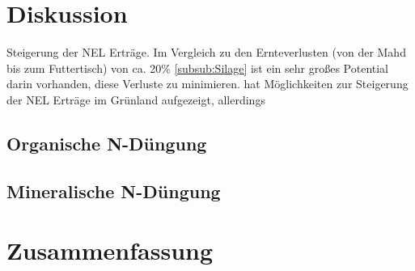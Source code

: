 \documentclass[12pt,titlepage]{scrartcl}
\begin{document}
\section{Diskussion}
\label{sec:Disukussion}
Steigerung der \ac{NEL} Erträge.
Im Vergleich zu den Ernteverlusten (von der Mahd bis zum Futtertisch) von ca. 20\% \ref{subsub:Silage} ist ein sehr großes Potential darin vorhanden, diese Verluste zu minimieren.
\textcite[33-36]{weggler2050leguminosen} hat Möglichkeiten zur Steigerung der \ac{NEL} Erträge im Grünland aufgezeigt, allerdings

\subsection{Organische N-Düngung}
\label{subsec:Dis:orgN}

\subsection{Mineralische N-Düngung}
\label{subsec:Dis:minN}

\section{Zusammenfassung}
\label{sec:Zusammenfassung}


\begin{singlespace} %
\begin{flushleft} %
\printbibliography[title=Literaturverzeichnis]
\end{flushleft}
\end{singlespace}

\end{document}
